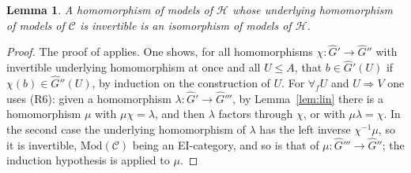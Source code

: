 \documentclass[11pt]{amsart}
\newtheorem{lem}[thm]{Lemma}
\theoremstyle{definition}
\newcommand{\Mod}{\mathrm{Mod}}
\newcommand{\cC}{\mathcal C}
\newcommand{\cH}{\mathcal H}
\begin{document}
\begin{lem}\label{lem:iso}
A homomorphism of models of $\cH$ whose underlying homomorphism of
models of $\cC$ is invertible is an isomorphism of models of $\cH$.
\end{lem}
\begin{proof}
The proof of \cite[Lemma~4.1]{Strings} applies. One shows, for all
homomorphisms $\chi\colon\hat G'\to\hat G''$ with invertible
underlying homomorphism at once and all $U\le A$, that $b\in\hat
G'(U)$ if $\chi(b)\in\hat G''(U)$, by induction on the construction of
$U$. For $\forall_fU$ and $U\Rightarrow V$ one uses (R6): given a
homomorphism $\lambda\colon\hat G'\to\hat G'''$, by
Lemma~\ref{lem:lin} there is a homomorphism $\mu$ with
$\mu\chi=\lambda$, and then $\lambda$ factors through $\chi$, or with
$\mu\lambda=\chi$. In the second case the underlying homomorphism of
$\lambda$ has the left inverse $\chi^{-1}\mu$, so it is invertible,
$\Mod(\cC)$ being an EI-category, and so is that of $\mu\colon\hat
G'''\to\hat G''$; the induction hypothesis is applied to $\mu$.
\end{proof}
\end{document}
